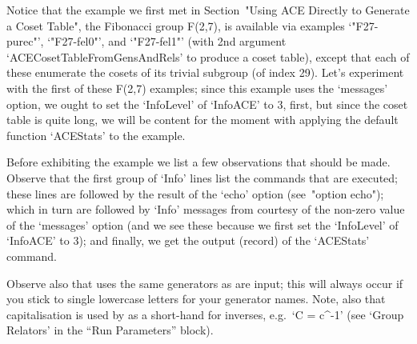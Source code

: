 \endexample

Notice that the example we first met in Section~"Using ACE Directly to
Generate a Coset Table", the Fibonacci group F(2,7), is available  via
examples  `"F27-purec"',  `"F27-fel0"',  and  `"F27-fel1"'  (with  2nd
argument `ACECosetTableFromGensAndRels' to  produce  a  coset  table),
except that each of these enumerate the cosets of its trivial subgroup
(of index 29).  Let's  experiment  with  the  first  of  these  F(2,7)
examples; since this example uses the `messages' option, we  ought  to
set the `InfoLevel' of `InfoACE' to 3,  first,  but  since  the  coset
table is quite long, we will be content for the moment  with  applying
the default function `ACEStats' to the example.

Before exhibiting the example we list a few observations  that  should
be made. Observe that  the  first  group  of  `Info'  lines  list  the
commands that are executed; these lines are followed by the result  of
the `echo' option (see~"option echo"); which in turn are  followed  by
`Info' messages from {\ACE} courtesy of  the  non-zero  value  of  the
`messages'  option  (and  we  see  these  because  we  first  set  the
`InfoLevel' of `InfoACE'  to  3);  and  finally,  we  get  the  output
(record) of the `ACEStats' command.

Observe also that {\ACE} uses the same generators as  are input;  this
will always occur if you stick to single lowercase  letters  for  your
generator names. Note, also that capitalisation is used by {\ACE} as a
short-hand for inverses, e.g.~`C = c^-1' (see `Group Relators' in  the
{\ACE} ``Run Parameters'' block).

